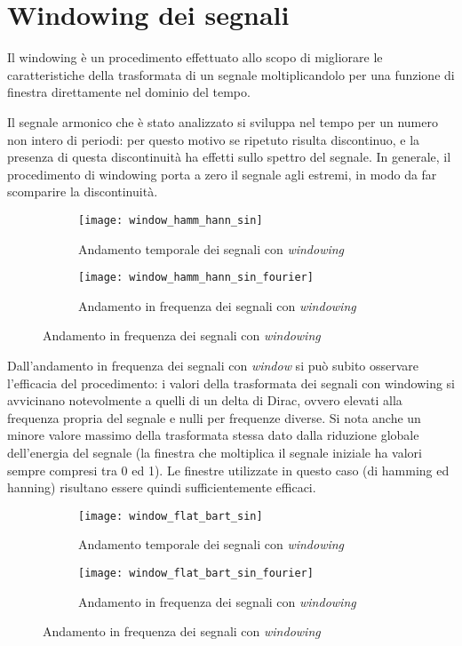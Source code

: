 \documentclass{article} %
\begin{document}
\section{Windowing dei segnali}
Il windowing è un procedimento effettuato allo scopo di migliorare le caratteristiche della trasformata di un segnale moltiplicandolo per una funzione di finestra direttamente nel dominio del tempo.\par
Il segnale armonico che è stato analizzato si sviluppa nel tempo per un numero non intero di periodi: per questo motivo se ripetuto risulta discontinuo, e la presenza di questa discontinuità ha effetti sullo spettro del segnale. In generale, il procedimento di windowing  porta a zero il segnale agli estremi, in modo da far scomparire la discontinuità.
\begin{figure}[h!]
	\begin{subfigure}{0.5\textwidth}
		\texttt{[image: window\_hamm\_hann\_sin]}
		\caption{Andamento temporale dei segnali con \textit{windowing}}
	\end{subfigure}
	\begin{subfigure}{0.5\textwidth}
		\texttt{[image: window\_hamm\_hann\_sin\_fourier]}
		\caption{Andamento in frequenza dei segnali con \textit{windowing}}
	\end{subfigure}
\end{figure}\par
Dall'andamento in frequenza dei segnali con \textit{window} si può subito osservare l'efficacia del procedimento: i valori della trasformata dei segnali con windowing si avvicinano notevolmente a quelli di un delta di Dirac, ovvero elevati alla frequenza propria del segnale e nulli per frequenze diverse. Si nota anche un minore valore massimo della trasformata stessa dato dalla riduzione globale dell'energia del segnale (la finestra che moltiplica il segnale iniziale ha valori sempre compresi tra 0 ed 1). Le finestre utilizzate in questo caso (di hamming ed hanning) risultano essere quindi sufficientemente efficaci.
\begin{figure}[h!]
	\begin{subfigure}{0.5\textwidth}
		\texttt{[image: window\_flat\_bart\_sin]}
		\caption{Andamento temporale dei segnali con \textit{windowing}}
	\end{subfigure}
	\begin{subfigure}{0.5\textwidth}
		\texttt{[image: window\_flat\_bart\_sin\_fourier]}
		\caption{Andamento in frequenza dei segnali con \textit{windowing}}
	\end{subfigure}
\end{figure}\par
\end{document}

